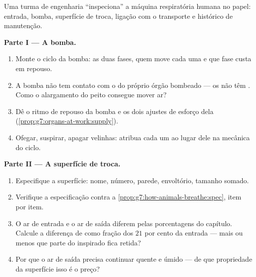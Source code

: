 \begin{problem}\label{pb:g7:lungs-and-gas-exchange:1}
Uma turma de engenharia ``inspeciona'' a máquina respiratória humana
no papel: entrada, bomba, superfície de troca, ligação com o
transporte e histórico de manutenção.

\medskip\noindent\textbf{Parte I --- A bomba.}
\begin{enumerate}
  \item Monte o ciclo da bomba: as duas fases, quem move cada uma e
        que fase custa  em repouso.
  \item A bomba não tem contato com o  do próprio órgão
        bombeado --- os  não têm . Como o alargamento do
        peito consegue mover ar?
  \item Dê o ritmo de repouso da bomba e os dois ajustes de esforço
        dela (\cref{prop:g7:organs-at-work:supply}).
  \item Ofegar, suspirar, apagar velinhas: atribua cada um ao lugar
        dele na mecânica do ciclo.
\end{enumerate}

\medskip\noindent\textbf{Parte II --- A superfície de
troca.}
\begin{enumerate}[resume]
  \item Especifique a superfície: nome, número, parede, envoltório,
        tamanho somado.
  \item Verifique a especificação contra a
        \cref{prop:g7:how-animals-breathe:spec}, item por item.
  \item O ar de entrada e o ar de saída diferem pelas porcentagens do
        capítulo. Calcule a diferença de  como fração dos $21$
        por cento da entrada --- mais ou menos que parte do 
        inspirado fica retida?
  \item Por que o ar de saída precisa continuar quente e úmido --- de
        que propriedade da superfície isso é o preço?
\end{enumerate}


\end{problem}
